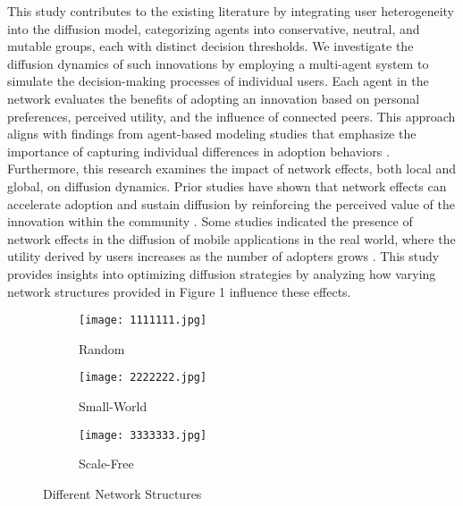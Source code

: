 \documentclass{article} %
\begin{document}
This study contributes to the existing literature by integrating user heterogeneity into the diffusion model, categorizing agents into conservative, neutral, and mutable groups, each with distinct decision thresholds. We investigate the diffusion dynamics of such innovations by employing a multi-agent system to simulate the decision-making processes of individual users. Each agent in the network evaluates the benefits of adopting an innovation based on personal preferences, perceived utility, and the influence of connected peers. This approach aligns with findings from agent-based modeling studies that emphasize the importance of capturing individual differences in adoption behaviors \cite{young_diffusion_1996}. Furthermore, this research examines the impact of network effects, both local and global, on diffusion dynamics. Prior studies have shown that network effects can accelerate adoption and sustain diffusion by reinforcing the perceived value of the innovation within the community \cite{muller_network_2019}. Some studies indicated the presence of network effects in the diffusion of mobile applications in the real world, where the utility derived by users increases as the number of adopters grows \cite{song2018ecosystem}. This study provides insights into optimizing diffusion strategies by analyzing how varying network structures provided in Figure 1 influence these effects.

\begin{figure}[h]
    \centering
    \begin{subfigure}{0.2\textwidth}
        \centering
        \texttt{[image: 1111111.jpg]} %
        \caption{Random}
        \label{fig:random_network}
    \end{subfigure}%
    \hspace{0.05\textwidth} %
    \begin{subfigure}{0.205\textwidth}
        \centering
        \texttt{[image: 2222222.jpg]} %
        \caption{Small-World}
        \label{fig:small_world_network}
    \end{subfigure}%
    \hspace{0.05\textwidth} %
    \begin{subfigure}{0.2\textwidth}
        \centering
        \texttt{[image: 3333333.jpg]} %
        \caption{Scale-Free}
        \label{fig:scale_free_network}
    \end{subfigure}
    \caption{Different Network Structures}
    \label{fig:network_structures}
\end{figure}
\end{document}
